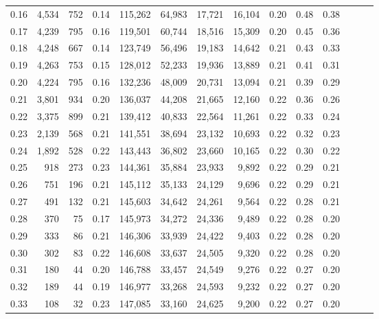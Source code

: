 \begin{tabular}{rrrrrrrrrrrrrr}
0.16 &   4,534 &    752 &  0.14 &  115,262 &   64,983 &  17,721 &  16,104 &  0.20 &  0.48 &      0.38 \\
0.17 &   4,239 &    795 &  0.16 &  119,501 &   60,744 &  18,516 &  15,309 &  0.20 &  0.45 &      0.36 \\
0.18 &   4,248 &    667 &  0.14 &  123,749 &   56,496 &  19,183 &  14,642 &  0.21 &  0.43 &      0.33 \\
0.19 &   4,263 &    753 &  0.15 &  128,012 &   52,233 &  19,936 &  13,889 &  0.21 &  0.41 &      0.31 \\
0.20 &   4,224 &    795 &  0.16 &  132,236 &   48,009 &  20,731 &  13,094 &  0.21 &  0.39 &      0.29 \\
0.21 &   3,801 &    934 &  0.20 &  136,037 &   44,208 &  21,665 &  12,160 &  0.22 &  0.36 &      0.26 \\
0.22 &   3,375 &    899 &  0.21 &  139,412 &   40,833 &  22,564 &  11,261 &  0.22 &  0.33 &      0.24 \\
0.23 &   2,139 &    568 &  0.21 &  141,551 &   38,694 &  23,132 &  10,693 &  0.22 &  0.32 &      0.23 \\
0.24 &   1,892 &    528 &  0.22 &  143,443 &   36,802 &  23,660 &  10,165 &  0.22 &  0.30 &      0.22 \\
0.25 &     918 &    273 &  0.23 &  144,361 &   35,884 &  23,933 &   9,892 &  0.22 &  0.29 &      0.21 \\
0.26 &     751 &    196 &  0.21 &  145,112 &   35,133 &  24,129 &   9,696 &  0.22 &  0.29 &      0.21 \\
0.27 &     491 &    132 &  0.21 &  145,603 &   34,642 &  24,261 &   9,564 &  0.22 &  0.28 &      0.21 \\
0.28 &     370 &     75 &  0.17 &  145,973 &   34,272 &  24,336 &   9,489 &  0.22 &  0.28 &      0.20 \\
0.29 &     333 &     86 &  0.21 &  146,306 &   33,939 &  24,422 &   9,403 &  0.22 &  0.28 &      0.20 \\
0.30 &     302 &     83 &  0.22 &  146,608 &   33,637 &  24,505 &   9,320 &  0.22 &  0.28 &      0.20 \\
0.31 &     180 &     44 &  0.20 &  146,788 &   33,457 &  24,549 &   9,276 &  0.22 &  0.27 &      0.20 \\
0.32 &     189 &     44 &  0.19 &  146,977 &   33,268 &  24,593 &   9,232 &  0.22 &  0.27 &      0.20 \\
0.33 &     108 &     32 &  0.23 &  147,085 &   33,160 &  24,625 &   9,200 &  0.22 &  0.27 &      0.20 \\

\end{tabular}
